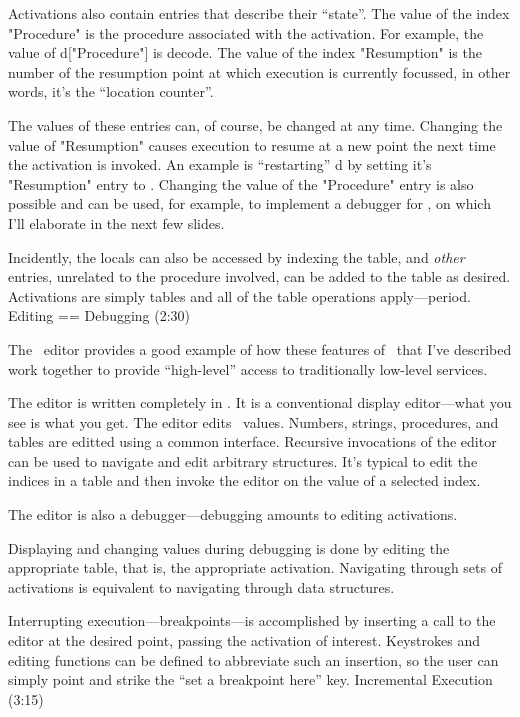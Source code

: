 Activations also contain
entries that describe their ``state''.
The value of the index {\pt "Procedure"} is the procedure
associated with the activation.
For example, the value of {\pt d["Procedure"] \rm is \pt decode}.
The value of the index {\pt "Resumption"} is the number of the
resumption point at which execution is currently focussed,
in other words, it's the ``location counter''.

The values of these entries can, of course, be changed at any time.
Changing the value of {\pt "Resumption"} causes
execution to resume at a new point the next time the activation
is invoked.
An example is ``restarting'' {\pt d} by setting
it's {\pt "Resumption"} entry to {}.
Changing the value of the {\pt "Procedure"} entry is also possible
and can be used, for example, to implement a debugger for \EZ,
on which I'll elaborate in the next few slides.

Incidently, the locals can also be accessed by indexing the table,
and {\sl other\/} entries, unrelated to the procedure involved,
can be added to the table as desired.
Activations are simply tables and all of the table operations apply---period.
\NewPage
\beginsection Editing == Debugging (2:30)

The \EZ\ editor provides a good example of how these features
of \EZ\ that I've described work together to provide
``high-level'' access to traditionally low-level services.

The editor is written completely in \EZ.
It is a conventional display editor---what you see is what you get.
The editor edits \EZ\ values.
Numbers, strings, procedures, and tables are
editted using a common interface.
Recursive invocations of the editor can be used
to navigate and edit arbitrary structures.
It's typical to edit the indices in
a table and then invoke the editor on the value of a selected index.

The editor is also a debugger---debugging amounts to editing activations.

Displaying and changing values during debugging
is done by editing the appropriate table, that is, the appropriate activation.
Navigating through sets of activations is equivalent
to navigating through data structures.

Interrupting execution---breakpoints---is accomplished by
inserting a call to the editor at the desired point,
passing the activation of interest.
Keystrokes and editing functions can be defined
to abbreviate such an insertion, so the user can simply point
and strike the ``set a breakpoint here'' key.
\NewPage
\beginsection Incremental Execution (3:15)

